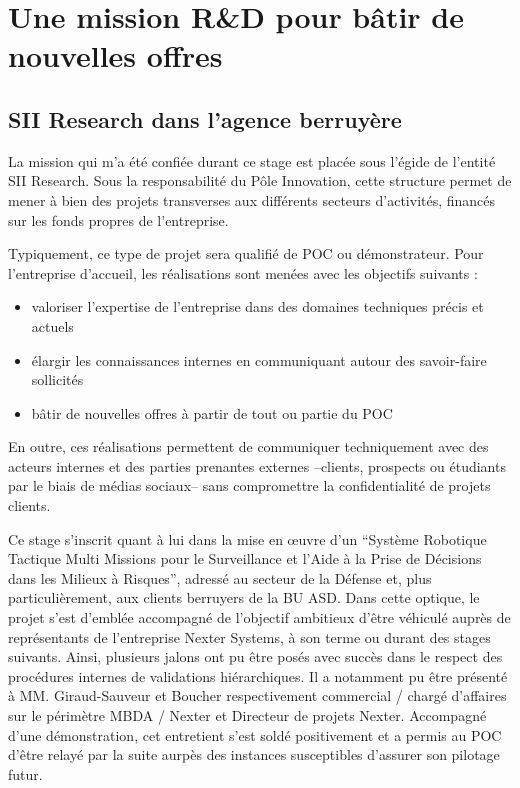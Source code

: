 \section{Une mission R\&D pour b\^{a}tir de nouvelles offres}

\subsection{SII Research dans l'agence berruyère}

La mission qui m'a été confiée durant ce stage est placée sous l'égide de l'entité SII Research. 
Sous la responsabilité du Pôle Innovation, cette structure permet de mener à bien des projets transverses aux différents secteurs d'activités, financés sur les fonds propres de l'entreprise.  

Typiquement, ce type de projet sera qualifié de \gls{POC} ou démonstrateur. Pour l'entreprise d'accueil, les réalisations sont menées avec les objectifs suivants : 

\begin{itemize}
  \item valoriser l'expertise de l'entreprise dans des domaines techniques précis et actuels
  \item élargir les connaissances internes en communiquant autour des savoir-faire sollicités
  \item bâtir de nouvelles offres à partir de tout ou partie du \gls{POC} 
\end{itemize}

En outre, ces réalisations permettent de communiquer techniquement avec des acteurs internes et des parties prenantes externes --clients, prospects ou étudiants par le biais de médias sociaux-- sans compromettre la confidentialité 
de projets clients. 

Ce stage s'inscrit quant à lui dans la mise en \oe{}uvre d’un ``Système Robotique Tactique Multi Missions pour le Surveillance et l’Aide à la Prise de Décisions dans les Milieux à Risques'', adressé au secteur de la Défense 
et, plus particulièrement, aux clients berruyers de la \gls{BU} \gls{ASD}.
Dans cette optique, le projet s'est d'emblée accompagné de l'objectif ambitieux d'être véhiculé auprès de représentants de l'entreprise Nexter Systems, à son terme ou durant des stages suivants.  
Ainsi, plusieurs jalons ont pu être posés avec succès dans le respect des procédures internes de validations hiérarchiques. 
Il a notamment pu être présenté à MM. Giraud-Sauveur et Boucher respectivement commercial / chargé d'affaires sur le périmètre MBDA / Nexter et Directeur de projets Nexter. 
Accompagné d'une démonstration, cet entretient s'est soldé positivement et a permis au \gls{POC} d'être relayé par la suite aurpès des instances susceptibles d'assurer son pilotage futur.  

